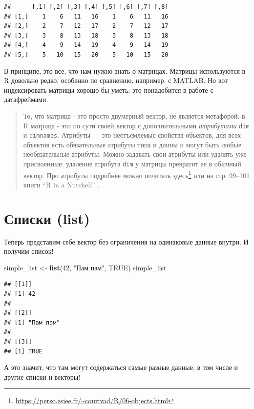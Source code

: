 \documentclass[
]{book}
\newenvironment{Shaded}{\begin{snugshade}}{\end{snugshade}}
\newcommand{\DecValTok}[1]{\textcolor[rgb]{0.00,0.00,0.81}{#1}}
\newcommand{\KeywordTok}[1]{\textcolor[rgb]{0.13,0.29,0.53}{\textbf{#1}}}
\newcommand{\NormalTok}[1]{#1}
\newcommand{\OtherTok}[1]{\textcolor[rgb]{0.56,0.35,0.01}{#1}}
\newcommand{\StringTok}[1]{\textcolor[rgb]{0.31,0.60,0.02}{#1}}
\renewcommand{\href}[2]{#2\footnote{\url{#1}}}
\begin{document}
\begin{verbatim}
##      [,1] [,2] [,3] [,4] [,5] [,6] [,7] [,8]
## [1,]    1    6   11   16    1    6   11   16
## [2,]    2    7   12   17    2    7   12   17
## [3,]    3    8   13   18    3    8   13   18
## [4,]    4    9   14   19    4    9   14   19
## [5,]    5   10   15   20    5   10   15   20
\end{verbatim}

В принципе, это все, что нам нужно знать о матрицах. Матрицы используются в R довольно редко, особенно по сравнению, например, с MATLAB. Но вот индексировать матрицы хорошо бы уметь: это понадобится в работе с датафреймами.

\begin{quote}
То, что матрица - это просто двумерный вектор, не является метафорой: в R матрица - это по сути своей вектор с дополнительными \emph{атрибутами} \texttt{dim} и \texttt{dimnames}. Атрибуты --- это неотъемлемые свойства объектов, для всех объектов есть обязательные атрибуты типа и длины и могут быть любые необязательные атрибуты. Можно задавать свои атрибуты или удалять уже присвоенные: удаление атрибута \texttt{dim} у матрицы превратит ее в обычный вектор. Про атрибуты подробнее можно почитать \href{https://perso.esiee.fr/~courivad/R/06-objects.html}{здесь} или на стр. 99--101 книги ``R in a Nutshell'' \citep{adler2010r}.
\end{quote}

\hypertarget{list}{%
\section{Списки (list)}\label{list}}

Теперь представим себе вектор без ограничения на одинаковые данные внутри. И получим список!

\begin{Shaded}
\begin{Highlighting}[]
\NormalTok{simple_list <-}\StringTok{ }\KeywordTok{list}\NormalTok{(}\DecValTok{42}\NormalTok{, }\StringTok{"Пам пам"}\NormalTok{, }\OtherTok{TRUE}\NormalTok{)}
\NormalTok{simple_list}
\end{Highlighting}
\end{Shaded}

\begin{verbatim}
## [[1]]
## [1] 42
## 
## [[2]]
## [1] "Пам пам"
## 
## [[3]]
## [1] TRUE
\end{verbatim}

А это значит, что там могут содержаться самые разные данные, в том числе и другие списки и векторы!
\end{document}
